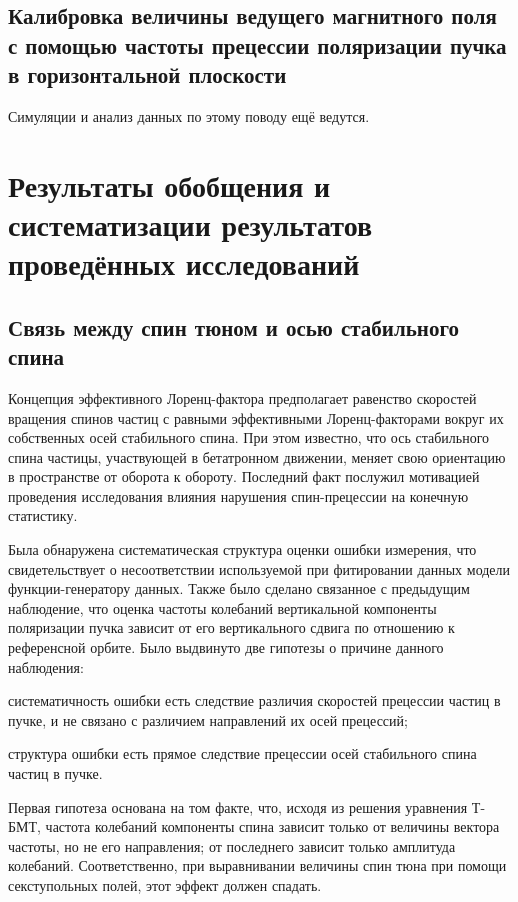 \documentclass{report}
\begin{document}
\section{Калибровка величины ведущего магнитного поля с помощью
  частоты прецессии поляризации пучка в горизонтальной плоскости}
Симуляции и анализ данных по этому поводу ещё ведутся.

\chapter{Результаты обобщения и систематизации результатов проведённых исследований}
\section{Связь между спин тюном и осью стабильного спина}
Концепция эффективного Лоренц-фактора предполагает равенство скоростей вращения спинов частиц с равными эффективными Лоренц-факторами вокруг их собственных осей стабильного спина. При этом известно, что ось стабильного спина частицы, участвующей в бетатронном движении, меняет свою ориентацию в пространстве от оборота к обороту. Последний факт послужил мотивацией проведения исследования влияния нарушения спин-прецессии на конечную статистику.

Была обнаружена систематическая структура оценки ошибки измерения, что свидетельствует о несоответствии используемой при фитировании данных модели функции-генератору данных. Также было сделано связанное с предыдущим наблюдение, что оценка частоты колебаний вертикальной компоненты поляризации пучка зависит от его вертикального сдвига по отношению к референсной орбите. Было выдвинуто две гипотезы о причине данного наблюдения:
\begin{inparaenum}
\item систематичность ошибки есть следствие различия скоростей прецессии частиц в пучке, и не связано с различием направлений их осей прецессий;
\item структура ошибки есть прямое следствие прецессии осей стабильного спина частиц в пучке.
\end{inparaenum}

Первая гипотеза основана на том факте, что, исходя из решения уравнения Т-БМТ, частота колебаний компоненты спина зависит только от величины вектора частоты, но не его направления; от последнего зависит только амплитуда колебаний. Соответственно, при выравнивании величины спин тюна при помощи секступольных полей, этот эффект должен спадать.
\end{document}
